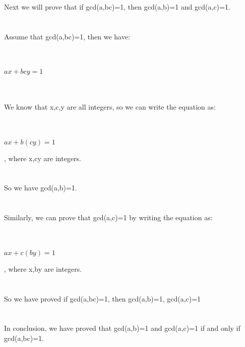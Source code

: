 \documentclass{article}
\begin{document}
Next we will prove that if gcd(a,bc)=1, then gcd(a,b)=1 and gcd(a,c)=1.\\
\\ \hspace*{\fill} \\
Assume that gcd(a,bc)=1, then we have:\\
\\ \hspace*{\fill} \\
\centerline{$ax+bcy=1$}
\\ \hspace*{\fill} \\
We know that x,c,y are all integers, so we can write the equation as:\\
\\ \hspace*{\fill} \\
\centerline{$ax+b(cy)=1$}, where x,cy are integers.\\
\\ \hspace*{\fill} \\
So we have gcd(a,b)=1.\\
\\ \hspace*{\fill} \\
Similarly, we can prove that gcd(a,c)=1 by writing the equation as:\\
\\ \hspace*{\fill} \\
\centerline{$ax+c(by)=1$}, where x,by are integers.\\
\\ \hspace*{\fill} \\
So we have proved if gcd(a,bc)=1, then gcd(a,b)=1, gcd(a,c)=1\\
\\ \hspace*{\fill} \\
In conclusion, we have proved that gcd(a,b)=1 and gcd(a,c)=1 if and only if gcd(a,bc)=1.\\
\\ \hspace*{\fill} \\
\end{document}
